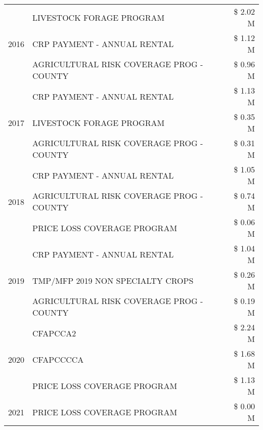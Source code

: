 \begin{tabular}{llr}
\cline{1-3}
\multirow[t]{3}{*}{2016} & LIVESTOCK FORAGE PROGRAM & \$ 2.02 M \\
 & CRP PAYMENT - ANNUAL RENTAL & \$ 1.12 M \\
 & AGRICULTURAL RISK COVERAGE PROG - COUNTY & \$ 0.96 M \\
\cline{1-3}
\multirow[t]{3}{*}{2017} & CRP PAYMENT - ANNUAL RENTAL & \$ 1.13 M \\
 & LIVESTOCK FORAGE PROGRAM & \$ 0.35 M \\
 & AGRICULTURAL RISK COVERAGE PROG - COUNTY & \$ 0.31 M \\
\cline{1-3}
\multirow[t]{3}{*}{2018} & CRP PAYMENT - ANNUAL RENTAL & \$ 1.05 M \\
 & AGRICULTURAL RISK COVERAGE PROG - COUNTY & \$ 0.74 M \\
 & PRICE LOSS COVERAGE PROGRAM & \$ 0.06 M \\
\cline{1-3}
\multirow[t]{3}{*}{2019} & CRP PAYMENT - ANNUAL RENTAL & \$ 1.04 M \\
 & TMP/MFP 2019 NON SPECIALTY CROPS & \$ 0.26 M \\
 & AGRICULTURAL RISK COVERAGE PROG - COUNTY & \$ 0.19 M \\
\cline{1-3}
\multirow[t]{3}{*}{2020} & CFAPCCA2 & \$ 2.24 M \\
 & CFAPCCCCA & \$ 1.68 M \\
 & PRICE LOSS COVERAGE PROGRAM & \$ 1.13 M \\
\cline{1-3}
2021 & PRICE LOSS COVERAGE PROGRAM & \$ 0.00 M \\
\cline{1-3}
\bottomrule
\end{tabular}
